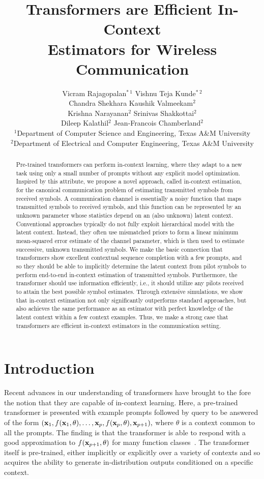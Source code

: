 \documentclass[journal,letterpaper,onecolumn]{IEEEtran}
\title{Transformers are Efficient In-Context\\ Estimators for Wireless Communication}
\author{
Vicram Rajagopalan$^{*~1}$ \quad
Vishnu Teja Kunde$^{*~2}$ \\
Chandra Shekhara Kaushik Valmeekam$^{2}$ \\
Krishna Narayanan$^{2}$ \quad
Srinivas Shakkottai$^{2}$ \\
Dileep Kalathil$^{2}$ \quad
Jean-Francois Chamberland$^{2}$ \\
{\small $^{1}$Department of Computer Science and Engineering, Texas A\&M University} \\
{\small $^{2}$Department of Electrical and Computer Engineering, Texas A\&M University}
}
\begin{document}
\maketitle
\def\thefootnote{*}

\begin{abstract}
Pre-trained transformers can perform in-context learning, where they adapt to a new task using only a small number of prompts without any explicit model optimization. Inspired by this attribute, we propose a novel approach, called in-context estimation, for the canonical communication problem of estimating transmitted symbols from received symbols. A communication channel is essentially a noisy function that maps transmitted symbols to received symbols, and this function can be represented by an unknown parameter whose statistics depend on an (also unknown) latent context. 
Conventional approaches typically do not fully exploit hierarchical model with the latent context. Instead, they often use mismatched priors to form a linear minimum mean-squared error estimate of the channel parameter,
which is then used to estimate successive, unknown transmitted symbols. We make the basic connection that transformers show excellent contextual sequence completion with a few prompts, and so they should be able to implicitly determine the latent context from pilot symbols to perform end-to-end in-context estimation of transmitted symbols. Furthermore, the transformer should use information efficiently, i.e., it should utilize any pilots received to attain the best possible symbol estimates. Through extensive simulations, we show that in-context estimation not only significantly outperforms standard approaches, but also achieves the same performance as an estimator with perfect knowledge of the latent context within a few context examples. Thus, we make a strong case that transformers are efficient in-context estimators in the communication setting. 
\end{abstract}


\section{Introduction}

Recent advances in our understanding of transformers have brought to the fore the notion that they are capable of in-context learning.  Here, a pre-trained transformer is presented with example prompts followed by query to be answered of the form $({\mathbf{x}}_1,f({\mathbf{x}}_1, \theta), \hdots, {\mathbf{x}}_p, f({\mathbf{x}}_p, \theta), {\mathbf{x}}_{p+1}),$ where $\theta$ is a context common to all the prompts.  The finding is that the transformer is able to respond with a good approximation to $f({\mathbf{x}}_{p+1},\theta)$ for many function classes~\cite{garg2023transformers,ahuja2023incontext}. 
The transformer itself is pre-trained, either implicitly or explicitly over a variety of contexts and so acquires the ability to generate in-distribution outputs conditioned on a specific context.
\end{document}
